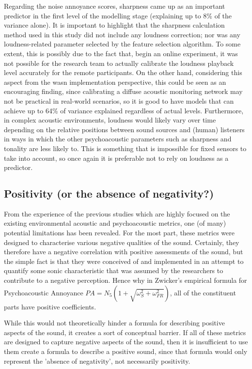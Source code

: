 Regarding the noise annoyance scores, sharpness came up as an important predictor in the first level of the modelling stage (explaining up to 8\% of the variance alone). It is important to highlight that the sharpness calculation method used in this study did not include any loudness correction; nor was any loudness-related parameter selected by the feature selection algorithm. To some extent, this is possibly due to the fact that, begin an online experiment, it was not possible for the research team to actually calibrate the loudness playback level accurately for the remote participants. On the other hand, considering this aspect from the \gls{wasn} implementation perspective, this could be seen as an encouraging finding, since calibrating a diffuse acoustic monitoring network may not be practical in real-world scenarios, so it is good to have models that can achieve up to 64\% of variance explained regardless of actual levels. Furthermore, in complex acoustic environments, loudness would likely vary over time depending on the relative positions between sound sources and (human) listeners in ways in which the other psychoacoustic parameters such as sharpness and tonality are less likely to. This is something that is impossible for fixed sensors to take into account, so once again it is preferable not to rely on loudness as a predictor.

\subsection*{Positivity (or the absence of negativity?)}
From the experience of the previous studies which are highly focused on the existing environmental acoustic and psychoacoustic metrics, one (of many) potential limitations has been revealed. For the most part, these metrics were designed to characterise various negative qualities of the sound. Certainly, they therefore have a negative correlation with positive assessments of the sound, but the simple fact is that they were conceived of and implemented in an attempt to quantify some sonic characteristic that was assumed by the researchers to contribute to a negative perception. Hence why in Zwicker's empirical formula for Psychoacoustic Annoyance \citep{PsychoacousticsfactsmodelsZwicker} $PA = N_5 (1 + \sqrt{\omega^2_S + \omega^2_{FR}})$, all of the constituent parts have positive coefficients.

While this would not theoretically hinder a formula for describing positive aspects of the sound, it creates a sort of conceptual barrier. If all of these metrics are designed to capture negative aspects of the sound, then it is insufficient to use them create a formula to describe a positive sound, since that formula would only represent the 'absence of negativity', not necessarily positivity.

